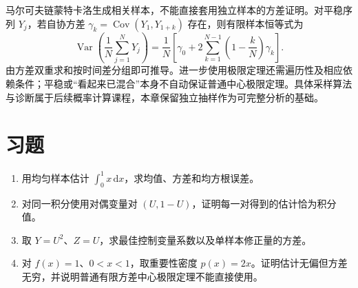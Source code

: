马尔可夫链蒙特卡洛生成相关样本，不能直接套用独立样本的方差证明。对平稳序列 $Y_j$，若自协方差 $\gamma_k=\operatorname{Cov}(Y_1,Y_{1+k})$ 存在，则有限样本恒等式为
\[
 \operatorname{Var}\left(\frac1N\sum_{j=1}^NY_j\right)
 =\frac1N\left[\gamma_0+2\sum_{k=1}^{N-1}\left(1-\frac{k}{N}\right)\gamma_k\right].
\]
由方差双重求和按时间差分组即可推导。进一步使用极限定理还需遍历性及相应依赖条件；平稳或“看起来已混合”本身不自动保证普通中心极限定理。具体采样算法与诊断属于后续概率计算课程，本章保留独立抽样作为可完整分析的基础。

\section{习题}
\begin{enumerate}[label=\arabic*.]
\item\label{exr:na-mc-variance} 用均匀样本估计 $\int_0^1x\,\mathrm dx$，求均值、方差和均方根误差。
\item\label{exr:na-mc-antithetic} 对同一积分使用对偶变量对 $(U,1-U)$，证明每一对得到的估计恰为积分值。
\item\label{exr:na-mc-control} 取 $Y=U^2$、$Z=U$，求最佳控制变量系数以及单样本修正量的方差。
\item\label{exr:na-mc-importance} 对 $f(x)=1$、$0<x<1$，取重要性密度 $p(x)=2x$。证明估计无偏但方差无穷，并说明普通有限方差中心极限定理不能直接使用。
\end{enumerate}

